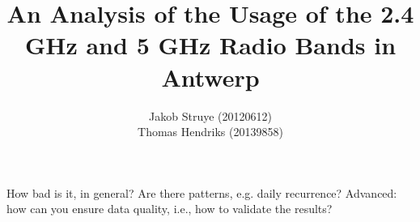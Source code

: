 \documentclass[a4paper, 11pt]{article}
\begin{document}
%
\title{An Analysis of the Usage of the 2.4 GHz and 5 GHz Radio Bands in Antwerp}


\author{
	Jakob Struye (20120612)\\ 
    Thomas Hendriks (20139858)\\
}

How bad is it, in general? 
Are there patterns, e.g. daily recurrence? 
Advanced: how can you ensure data quality, i.e., how to validate the results? 

\maketitle


\tableofcontents
\clearpage
\end{document}
